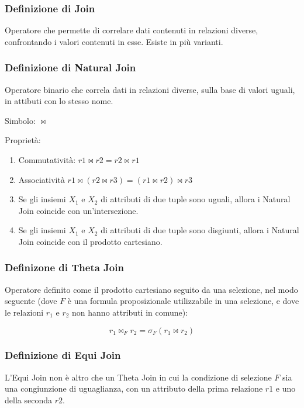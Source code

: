 \subsubsection{Definizione di Join}
Operatore che permette di correlare dati contenuti in relazioni diverse,
confrontando i valori contenuti in esse. Esiste in più varianti.

\subsubsection{Definizione di Natural Join}
Operatore binario che correla dati in relazioni diverse, sulla base di valori
uguali, in attibuti con lo stesso nome.

\noindent
Simbolo: $\bowtie$

\noindent
Proprietà:

\begin{enumerate}
  \item Commutatività: $r1 \bowtie r2 = r2 \bowtie r1$
  \item Associatività $r1 \bowtie (r2 \bowtie r3) = (r1 \bowtie r2) \bowtie r3$
  \item Se gli insiemi $X_1$ e $X_2$ di attributi di due tuple sono uguali, allora i
  Natural Join coincide con un'intersezione.
  \item Se gli insiemi $X_1$ e $X_2$ di attributi di due tuple sono disgiunti, allora i
  Natural Join coincide con il prodotto cartesiano.
\end{enumerate}

\subsubsection{Definizone di Theta Join}
Operatore definito come il prodotto cartesiano seguito da una selezione, nel modo seguente
(dove $F$ è una formula proposizionale utilizzabile in una selezione, e dove le relazioni
$r_1$ e $r_2$ non hanno attributi in comune):

\begin{displaymath}
  r_1 \bowtie_{F} r_2 = \sigma_{F}(r_1 \bowtie r_2)
\end{displaymath}

\subsubsection{Definizione di Equi Join}
L'Equi Join non è altro che un Theta Join in cui la condizione di selezione $F$
sia una congiunzione di uguaglianza, con un attributo della prima relazione $r1$
e uno della seconda $r2$.

